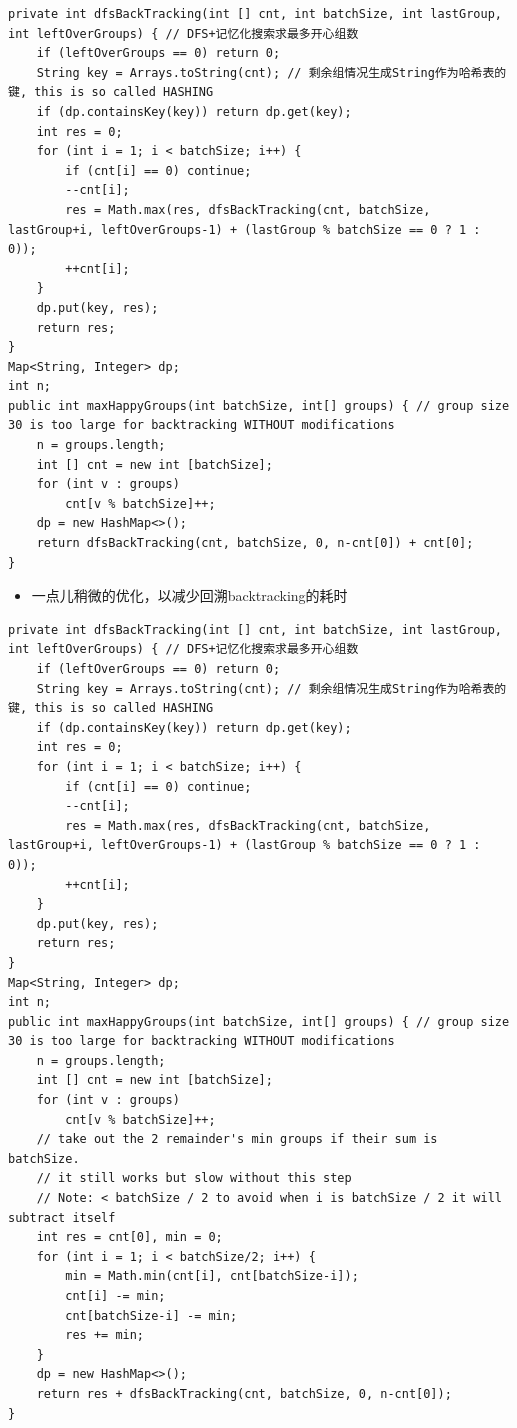 \documentclass[9pt, b5paaper]{book}
\begin{document}
\begin{verbatim}
private int dfsBackTracking(int [] cnt, int batchSize, int lastGroup, int leftOverGroups) { // DFS+记忆化搜索求最多开心组数
    if (leftOverGroups == 0) return 0;
    String key = Arrays.toString(cnt); // 剩余组情况生成String作为哈希表的键, this is so called HASHING
    if (dp.containsKey(key)) return dp.get(key);
    int res = 0;
    for (int i = 1; i < batchSize; i++) {
        if (cnt[i] == 0) continue;
        --cnt[i]; 
        res = Math.max(res, dfsBackTracking(cnt, batchSize, lastGroup+i, leftOverGroups-1) + (lastGroup % batchSize == 0 ? 1 : 0));
        ++cnt[i]; 
    }
    dp.put(key, res);
    return res;
}
Map<String, Integer> dp;
int n;
public int maxHappyGroups(int batchSize, int[] groups) { // group size 30 is too large for backtracking WITHOUT modifications
    n = groups.length;
    int [] cnt = new int [batchSize];
    for (int v : groups) 
        cnt[v % batchSize]++;
    dp = new HashMap<>();
    return dfsBackTracking(cnt, batchSize, 0, n-cnt[0]) + cnt[0];
}
\end{verbatim}
\begin{itemize}
\item 一点儿稍微的优化，以减少回溯backtracking的耗时
\end{itemize}
\begin{verbatim}
private int dfsBackTracking(int [] cnt, int batchSize, int lastGroup, int leftOverGroups) { // DFS+记忆化搜索求最多开心组数
    if (leftOverGroups == 0) return 0;
    String key = Arrays.toString(cnt); // 剩余组情况生成String作为哈希表的键, this is so called HASHING
    if (dp.containsKey(key)) return dp.get(key);
    int res = 0;
    for (int i = 1; i < batchSize; i++) {
        if (cnt[i] == 0) continue;
        --cnt[i]; 
        res = Math.max(res, dfsBackTracking(cnt, batchSize, lastGroup+i, leftOverGroups-1) + (lastGroup % batchSize == 0 ? 1 : 0));
        ++cnt[i]; 
    }
    dp.put(key, res);
    return res;
}
Map<String, Integer> dp;
int n;
public int maxHappyGroups(int batchSize, int[] groups) { // group size 30 is too large for backtracking WITHOUT modifications
    n = groups.length;
    int [] cnt = new int [batchSize];
    for (int v : groups) 
        cnt[v % batchSize]++;
    // take out the 2 remainder's min groups if their sum is batchSize.
    // it still works but slow without this step
    // Note: < batchSize / 2 to avoid when i is batchSize / 2 it will subtract itself
    int res = cnt[0], min = 0;
    for (int i = 1; i < batchSize/2; i++) {
        min = Math.min(cnt[i], cnt[batchSize-i]);
        cnt[i] -= min;
        cnt[batchSize-i] -= min;
        res += min;
    }
    dp = new HashMap<>();
    return res + dfsBackTracking(cnt, batchSize, 0, n-cnt[0]);
}
\end{verbatim}
\end{document}
